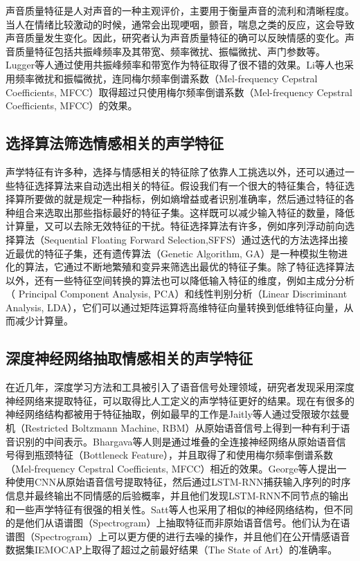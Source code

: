 声音质量特征是人对声音的一种主观评价，主要用于衡量声音的流利和清晰程度。当人在情绪比较激动的时候，通常会出现哽咽，颤音，喘息之类的反应，这会导致声音质量发生变化。因此，研究者认为声音质量特征的确可以反映情感的变化。声音质量特征包括共振峰频率及其带宽、频率微扰、振幅微扰、声门参数等。Lugger等人通过使用共振峰频率和带宽作为特征取得了很不错的效果。Li等人也采用频率微扰和振幅微扰，连同梅尔频率倒谱系数（Mel-frequency Cepstral Coefficients, MFCC）取得超过只使用梅尔频率倒谱系数（Mel-frequency Cepstral Coefficients, MFCC）的效果。

\subsection{选择算法筛选情感相关的声学特征}
\label{ssec:algorithm_select}
声学特征有许多种，选择与情感相关的特征除了依靠人工挑选以外，还可以通过一些特征选择算法来自动选出相关的特征。假设我们有一个很大的特征集合，特征选择算所要做的就是规定一种指标，例如熵增益或者识别准确率，然后通过特征的各种组合来选取出那些指标最好的特征子集。这样既可以减少输入特征的数量，降低计算量，又可以去除无效特征的干扰。特征选择算法有许多，例如序列浮动前向选择算法（Sequential Floating Forward Selection,SFFS）通过迭代的方法选择出接近最优的特征子集，还有遗传算法（Genetic Algorithm, GA）是一种模拟生物进化的算法，它通过不断地繁殖和变异来筛选出最优的特征子集。除了特征选择算法以外，还有一些特征空间转换的算法也可以降低输入特征的维度，例如主成分分析（ Principal Component Analysis, PCA）和线性判别分析（Linear Discriminant Analysis, LDA），它们可以通过矩阵运算将高维特征向量转换到低维特征向量，从而减少计算量。

\subsection{深度神经网络抽取情感相关的声学特征}
\label{ssec:dnn_extract}
在近几年，深度学习方法和工具被引入了语音信号处理领域，研究者发现采用深度神经网络来提取特征，可以取得比人工定义的声学特征更好的结果。现在有很多的神经网络结构都被用于特征抽取，例如最早的工作是Jaitly等人通过受限玻尔兹曼机（Restricted Boltzmann Machine, RBM）从原始语音信号上得到一种有利于语音识别的中间表示。Bhargava等人则是通过堆叠的全连接神经网络从原始语音信号得到瓶颈特征（Bottleneck Feature），并且取得了和使用梅尔频率倒谱系数（Mel-frequency Cepstral Coefficients, MFCC）相近的效果。George等人提出一种使用CNN从原始语音信号提取特征，然后通过LSTM-RNN捕获输入序列的时序信息并最终输出不同情感的后验概率，并且他们发现LSTM-RNN不同节点的输出和一些声学特征有很强的相关性。Satt等人也采用了相似的神经网络结构，但不同的是他们从语谱图（Spectrogram）上抽取特征而非原始语音信号。他们认为在语谱图（Spectrogram）上可以更方便的进行去噪的操作，并且他们在公开情感语音数据集IEMOCAP上取得了超过之前最好结果（The State of Art）的准确率。

